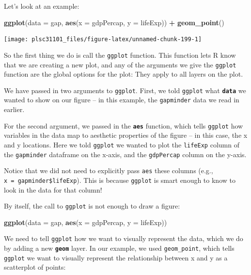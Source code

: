 \documentclass[
]{book}
\newenvironment{Shaded}{\begin{snugshade}}{\end{snugshade}}
\newcommand{\DataTypeTok}[1]{\textcolor[rgb]{0.13,0.29,0.53}{#1}}
\newcommand{\KeywordTok}[1]{\textcolor[rgb]{0.13,0.29,0.53}{\textbf{#1}}}
\newcommand{\NormalTok}[1]{#1}
\newcommand{\OperatorTok}[1]{\textcolor[rgb]{0.81,0.36,0.00}{\textbf{#1}}}
\newcommand{\StringTok}[1]{\textcolor[rgb]{0.31,0.60,0.02}{#1}}
\begin{document}
Let's look at an example:

\begin{Shaded}
\begin{Highlighting}[]
\KeywordTok{ggplot}\NormalTok{(}\DataTypeTok{data =}\NormalTok{ gap, }\KeywordTok{aes}\NormalTok{(}\DataTypeTok{x =}\NormalTok{ gdpPercap, }\DataTypeTok{y =}\NormalTok{ lifeExp)) }\OperatorTok{+}
\StringTok{  }\KeywordTok{geom_point}\NormalTok{()}
\end{Highlighting}
\end{Shaded}

\begin{center}\texttt{[image: plsc31101\_files/figure-latex/unnamed-chunk-199-1]} \end{center}

So the first thing we do is call the \texttt{ggplot} function. This function lets R know that we are creating a new plot, and any of the arguments we give the \texttt{ggplot} function are the global options for the plot: They apply to all layers on the plot.

We have passed in two arguments to \texttt{ggplot}. First, we told \texttt{ggplot} what \textbf{\texttt{data}} we wanted to show on our figure -- in this example, the \texttt{gapminder} data we read in earlier.

For the second argument, we passed in the \textbf{\texttt{aes}} function, which tells \texttt{ggplot} how variables in the data map to aesthetic properties of the figure -- in this case, the x and y locations. Here we told \texttt{ggplot} we wanted to plot the \texttt{lifeExp} column of the \texttt{gapminder} dataframe on the x-axis, and the \texttt{gdpPercap} column on the y-axis.

Notice that we did not need to explicitly pass \texttt{aes} these columns (e.g., \texttt{x\ =\ gapminder\$lifeExp}). This is because \texttt{ggplot} is smart enough to know to look in the data for that column!

By itself, the call to \texttt{ggplot} is not enough to draw a figure:

\begin{Shaded}
\begin{Highlighting}[]
\KeywordTok{ggplot}\NormalTok{(}\DataTypeTok{data =}\NormalTok{ gap, }\KeywordTok{aes}\NormalTok{(}\DataTypeTok{x =}\NormalTok{ gdpPercap, }\DataTypeTok{y =}\NormalTok{ lifeExp))}
\end{Highlighting}
\end{Shaded}

We need to tell \texttt{ggplot} how we want to visually represent the data, which we do by adding a new \textbf{\texttt{geom}} layer. In our example, we used \texttt{geom\_point}, which tells \texttt{ggplot} we want to visually represent the relationship between x and y as a scatterplot of points:
\end{document}
